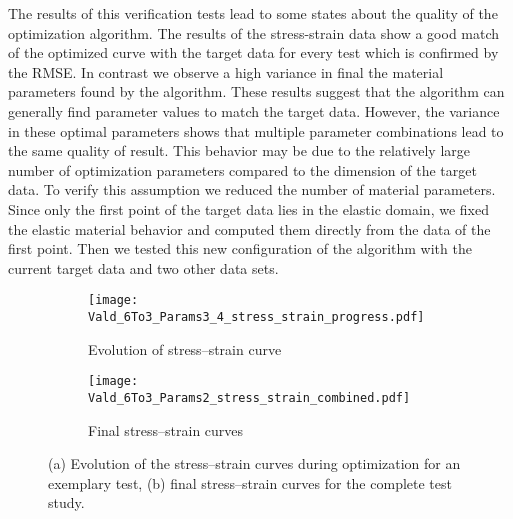     The results of this verification tests lead to some states about the quality of the optimization algorithm. The results of the stress-strain data show a good match of the optimized curve with the target data for every test which is confirmed by the RMSE. In contrast we observe a high variance in final the material parameters found by the algorithm. These results suggest that the algorithm can generally find parameter values to match the target data. However, the variance in these optimal parameters shows that multiple parameter combinations lead to the same quality of result. This behavior may be due to the relatively large number of optimization parameters compared to the dimension of the target data. To verify this assumption we reduced the number of material parameters. Since only the first point of the target data lies in the elastic domain, we fixed the elastic material behavior and computed them directly from the data of the first point. Then we tested this new configuration of the algorithm with the current target data and two other data sets.



\begin{figure}[H]
    \centering

    \begin{subfigure}[t]{0.495\textwidth}
        \centering
        \texttt{[image: Vald\_6To3\_Params3\_4\_stress\_strain\_progress.pdf]}
        \caption{Evolution of stress–strain curve}
        \label{fig:verif_progress_stress_strain_curve}
    \end{subfigure}
    \hfill
    \begin{subfigure}[t]{0.495\textwidth}
        \centering
        \texttt{[image: Vald\_6To3\_Params2\_stress\_strain\_combined.pdf]}
        \caption{Final stress–strain curves}
        \label{fig:verif_final_stress_strain_curves}
    \end{subfigure}

    \caption{%
        (a) Evolution of the stress–strain curves during optimization for an exemplary test,
        (b) final stress–strain curves for the complete test study.%
    }
    \label{fig:complete}
\end{figure}

